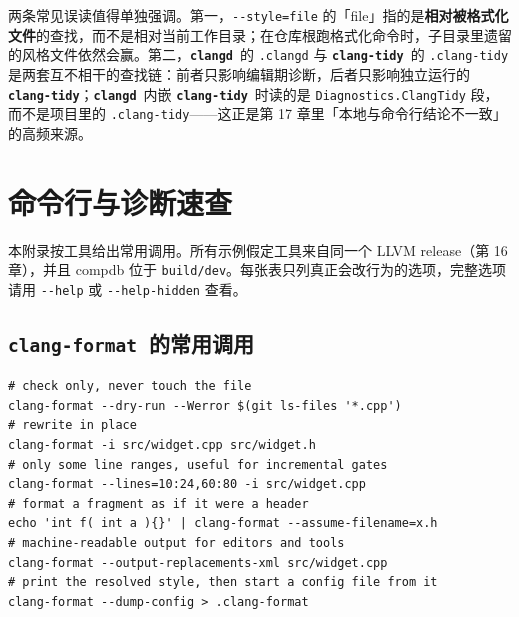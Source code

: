 \documentclass[12pt,a4paper,fontset=fandol]{ctexbook}
\newcommand{\Opt}[1]{\texttt{-\/-#1}}
\newcommand{\Lib}[1]{\textbf{\texttt{#1}}}
\newcommand{\Tidy}{\Lib{clang-tidy}}
\newcommand{\Fmt}{\Lib{clang-format}}
\newcommand{\CD}{\Lib{clangd}}
\begin{document}
两条常见误读值得单独强调。第一，\Opt{style=file} 的「file」指的是\textbf{相对被格式化文件}的查找，而不是相对当前工作目录；在仓库根跑格式化命令时，子目录里遗留的风格文件依然会赢。第二，\CD\ 的 \texttt{.clangd} 与 \Tidy\ 的 \texttt{.clang-tidy} 是两套互不相干的查找链：前者只影响编辑期诊断，后者只影响独立运行的 \Tidy；\CD\ 内嵌 \Tidy\ 时读的是 \texttt{Diagnostics.\allowbreak ClangTidy} 段，而不是项目里的 \texttt{.clang-tidy}——这正是第 17 章里「本地与命令行结论不一致」的高频来源。

\chapter{命令行与诊断速查}\label{ch:appB}

本附录按工具给出常用调用。所有示例假定工具来自同一个 LLVM release（第 16 章），并且 compdb 位于 \texttt{build/dev}。每张表只列真正会改行为的选项，完整选项请用 \Opt{help} 或 \Opt{help-hidden} 查看。

\section{\Fmt\ 的常用调用}\label{sec:appB-s1}

\begin{lstlisting}[style=shellstyle,caption={clang-format 的典型用法}]
# check only, never touch the file
clang-format --dry-run --Werror $(git ls-files '*.cpp')
# rewrite in place
clang-format -i src/widget.cpp src/widget.h
# only some line ranges, useful for incremental gates
clang-format --lines=10:24,60:80 -i src/widget.cpp
# format a fragment as if it were a header
echo 'int f( int a ){}' | clang-format --assume-filename=x.h
# machine-readable output for editors and tools
clang-format --output-replacements-xml src/widget.cpp
# print the resolved style, then start a config file from it
clang-format --dump-config > .clang-format
\end{lstlisting}
\end{document}
